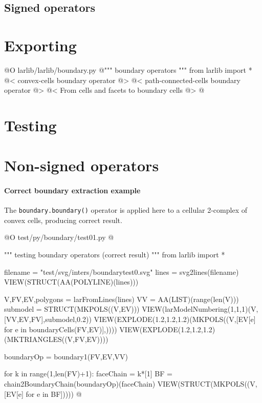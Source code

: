 \documentclass[11pt,oneside]{article}	%
\begin{document}
\subsection{Signed operators}


\section{Exporting}

@O larlib/larlib/boundary.py
@{""" boundary operators """
from larlib import *
@< convex-cells boundary operator @>
@< path-connected-cells boundary operator @>
@< From cells and facets to boundary cells @>
@}


\section{Testing}

\section{Non-signed operators}

\paragraph{Correct boundary extraction example}

The \texttt{boundary.boundary()} operator is applied here to a cellular 2-complex of convex cells, producing correct result.

@O test/py/boundary/test01.py
@{""" testing boundary operators (correct result) """
from larlib import *

filename = "test/svg/inters/boundarytest0.svg"
lines = svg2lines(filename)
VIEW(STRUCT(AA(POLYLINE)(lines)))
    
V,FV,EV,polygons = larFromLines(lines)
VV = AA(LIST)(range(len(V)))
submodel = STRUCT(MKPOLS((V,EV)))
VIEW(larModelNumbering(1,1,1)(V,[VV,EV,FV],submodel,0.2))
VIEW(EXPLODE(1.2,1.2,1.2)(MKPOLS((V,[EV[e] for e in boundaryCells(FV,EV)],))))
VIEW(EXPLODE(1.2,1.2,1.2)(MKTRIANGLES((V,FV,EV))))

boundaryOp = boundary1(FV,EV,VV)

for k in range(1,len(FV)+1):
    faceChain = k*[1]
    BF = chain2BoundaryChain(boundaryOp)(faceChain)
    VIEW(STRUCT(MKPOLS((V,[EV[e] for e in BF]))))
@}
\end{document}
